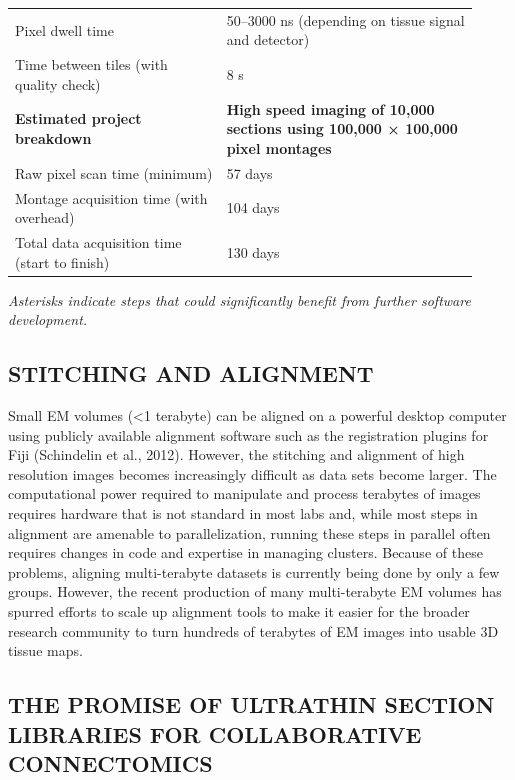 \documentclass{article}
\begin{document}
\begin{center}
\begin{tabular}{p{0.42\linewidth}p{0.5\linewidth}}
Pixel dwell time & 50–3000 ns (depending on tissue signal and detector)\\
Time between tiles (with quality check) & 8 s\\
\midrule
\textbf{Estimated project breakdown} & \textbf{High speed imaging of 10,000 sections using 100,000 × 100,000 pixel montages}\\
\midrule
Raw pixel scan time (minimum) & 57 days\\
Montage acquisition time (with overhead) & 104 days\\
Total data acquisition time (start to finish) & 130 days\\
\bottomrule
\end{tabular}\par\medskip
\noindent\emph{Asterisks indicate steps that could significantly benefit from further software development.}
\end{center}

\subsection*{STITCHING AND ALIGNMENT}

Small EM volumes (<1 terabyte) can be aligned on a powerful desktop computer using publicly available alignment software such as the registration plugins for Fiji (Schindelin et al., 2012). However, the stitching and alignment of high resolution images becomes increasingly difficult as data sets become larger. The computational power required to manipulate and process terabytes of images requires hardware that is not standard in most labs and, while most steps in alignment are amenable to parallelization, running these steps in parallel often requires changes in code and expertise in managing clusters. Because of these problems, aligning multi-terabyte datasets is currently being done by only a few groups. However, the recent production of many multi-terabyte EM volumes has spurred efforts to scale up alignment tools to make it easier for the broader research community to turn hundreds of terabytes of EM images into usable 3D tissue maps.

\subsection*{THE PROMISE OF ULTRATHIN SECTION LIBRARIES FOR COLLABORATIVE CONNECTOMICS}
\end{document}
